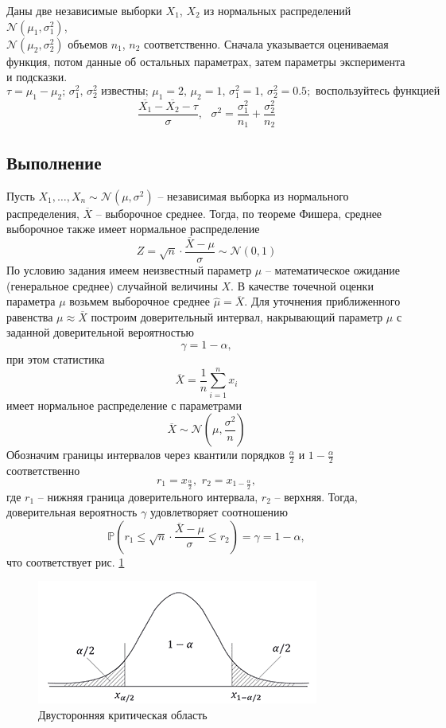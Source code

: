\documentclass[a4paper, 12pt]{article}
\begin{document}
    Даны две независимые выборки $X_1$, $X_2$ из нормальных распределений $\mathcal{N}\left(\mu_1,\sigma_1^2\right)$,\\
    $\mathcal{N}(\mu_2,\sigma_2^2)$ объемов $n_1$, $n_2$ соответственно.
    Сначала указывается оцениваемая функция, потом данные об остальных параметрах, затем параметры эксперимента и подсказки.
    $$\tau=\mu_1-\mu_2;\,\sigma_1^2,\,\sigma_2^2\text{ известны};\,\mu_1=2,\,\mu_2=1,\,\sigma_1^2=1,\,\sigma_2^2=0.5;\text{ воспользуйтесь функцией}$$
    $$\dfrac{\overline{X_1}-\overline{X_2}-\tau}{\sigma},\,\,\,\,\sigma^2=\dfrac{\sigma_1^2}{n_1}+\dfrac{\sigma_2^2}{n_2}$$


    \subsection{Выполнение}
    Пусть $X_1,\hdots,X_n\sim\mathcal{N}\left(\mu,\sigma^2\right)$ -- независимая выборка из нормального распределения,
    $\overline{X}$ -- выборочное среднее. Тогда, по теореме Фишера, среднее выборочное также имеет нормальное распределение
    $$Z=\sqrt{n}\cdot\dfrac{\overline{X}-\mu}{\sigma}\sim\mathcal{N}\left(0,1\right)$$
    По условию задания имеем неизвестный параметр $\mu$ -- математическое ожидание (генеральное среднее) случайной величины $X$. В качестве точечной
    оценки параметра $\mu$ возьмем выборочное среднее $\hat{\mu}=\overline{X}$. Для уточнения приближенного равенства
    $\mu\approx \overline{X}$ построим доверительный интервал, накрывающий параметр $\mu$ с заданной доверительной
    вероятностью $$\gamma=1-\alpha,$$ при этом статистика $$\overline{X}=\dfrac{1}{n}\sum\limits_{i=1}^{n}x_i$$
    имеет нормальное распределение с параметрами $$\overline{X}\sim\mathcal{N}\left(\mu,\dfrac{\sigma^2}{n}\right)$$
    Обозначим границы интервалов через квантили порядков $\frac{\alpha}{2}$ и $1-\frac{\alpha}{2}$ соответственно
    $$r_1=x_{\frac{\alpha}{2}},\,\,r_2=x_{1-\frac{\alpha}{2}},$$ где $r_1$ -- нижняя граница доверительного интервала, $r_2$ -- верхняя.
    Тогда, доверительная вероятность $\gamma$ удовлетворяет соотношению
    $$\mathbb{P}\left(r_1\leq\sqrt{n}\cdot\dfrac{\overline{X}-\mu}{\sigma}\leq r_2\right)=\gamma=1-\alpha,$$
    что соответствует рис. \ref{fig:normal}
    \begin{figure}[H]
        \centering
        \includegraphics[scale=1.2]{normal.png}
        \captionsetup{skip=0pt}
        \caption{Двусторонняя критическая область}
        \label{fig:normal}
    \end{figure}
\end{document}
